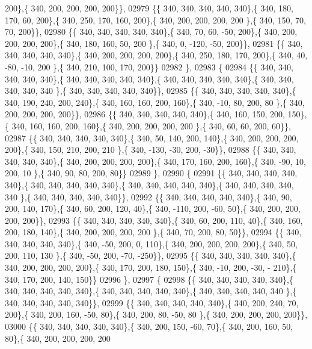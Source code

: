 \begin{DoxyCode}
      200\},\{ 340, 200, 200, 200, 200\}\},
02979 \{\{ 340, 340, 340, 340, 340\},\{ 340, 180, 170,  60, 200\},\{ 340, 250, 170, 160, 200\},\{ 340, 200, 200, 200, 200
      \},\{ 340, 150,  70,  70, 200\}\},
02980 \{\{ 340, 340, 340, 340, 340\},\{ 340,  70,  60, -50, 200\},\{ 340, 200, 200, 200, 200\},\{ 340, 180, 160,  50, 200
      \},\{ 340,   0, -120, -50, 200\}\},
02981 \{\{ 340, 340, 340, 340, 340\},\{ 340, 200, 200, 200, 200\},\{ 340, 250, 180, 170, 200\},\{ 340,  40, -80, -10, 200
      \},\{ 340, 210, 100, 170, 200\}\}
02982 \},
02983 \{
02984 \{\{ 340, 340, 340, 340, 340\},\{ 340, 340, 340, 340, 340\},\{ 340, 340, 340, 340, 340\},\{ 340, 340, 340, 340, 340
      \},\{ 340, 340, 340, 340, 340\}\},
02985 \{\{ 340, 340, 340, 340, 340\},\{ 340, 190, 240, 200, 240\},\{ 340, 160, 160, 200, 160\},\{ 340, -10,  80, 200,  80
      \},\{ 340, 200, 200, 200, 200\}\},
02986 \{\{ 340, 340, 340, 340, 340\},\{ 340, 160, 150, 200, 150\},\{ 340, 160, 160, 200, 160\},\{ 340, 200, 200, 200, 200
      \},\{ 340,  60,  60, 200,  60\}\},
02987 \{\{ 340, 340, 340, 340, 340\},\{ 340,  50, 140, 200, 140\},\{ 340, 200, 200, 200, 200\},\{ 340, 150, 210, 200, 210
      \},\{ 340, -130, -30, 200, -30\}\},
02988 \{\{ 340, 340, 340, 340, 340\},\{ 340, 200, 200, 200, 200\},\{ 340, 170, 160, 200, 160\},\{ 340, -90,  10, 200,  10
      \},\{ 340,  90,  80, 200,  80\}\}
02989 \},
02990 \{
02991 \{\{ 340, 340, 340, 340, 340\},\{ 340, 340, 340, 340, 340\},\{ 340, 340, 340, 340, 340\},\{ 340, 340, 340, 340, 340
      \},\{ 340, 340, 340, 340, 340\}\},
02992 \{\{ 340, 340, 340, 340, 340\},\{ 340,  90, 200, 140, 170\},\{ 340,  60, 200, 120,  40\},\{ 340, -110, 200, -60,  
      50\},\{ 340, 200, 200, 200, 200\}\},
02993 \{\{ 340, 340, 340, 340, 340\},\{ 340,  60, 200, 110,  40\},\{ 340, 160, 200, 180, 140\},\{ 340, 200, 200, 200, 200
      \},\{ 340,  70, 200,  80,  50\}\},
02994 \{\{ 340, 340, 340, 340, 340\},\{ 340, -50, 200,   0, 110\},\{ 340, 200, 200, 200, 200\},\{ 340,  50, 200, 110, 130
      \},\{ 340, -50, 200, -70, -250\}\},
02995 \{\{ 340, 340, 340, 340, 340\},\{ 340, 200, 200, 200, 200\},\{ 340, 170, 200, 180, 150\},\{ 340, -10, 200, -30, -
      210\},\{ 340, 170, 200, 140, 150\}\}
02996 \},
02997 \{
02998 \{\{ 340, 340, 340, 340, 340\},\{ 340, 340, 340, 340, 340\},\{ 340, 340, 340, 340, 340\},\{ 340, 340, 340, 340, 340
      \},\{ 340, 340, 340, 340, 340\}\},
02999 \{\{ 340, 340, 340, 340, 340\},\{ 340, 200, 240,  70, 200\},\{ 340, 200, 160, -50,  80\},\{ 340, 200,  80, -50,  80
      \},\{ 340, 200, 200, 200, 200\}\},
03000 \{\{ 340, 340, 340, 340, 340\},\{ 340, 200, 150, -60,  70\},\{ 340, 200, 160,  50,  80\},\{ 340, 200, 200, 200, 200

\end{DoxyCode}
